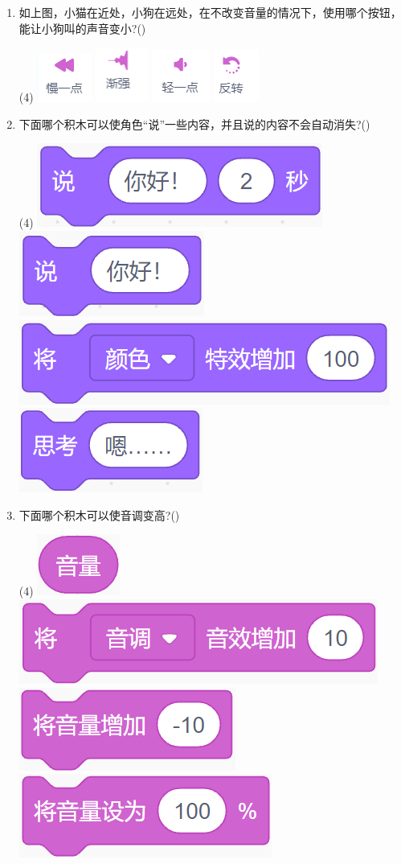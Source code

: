\documentclass[10pt, a4paper]{article}
\begin{document}
\begin{enumerate}
        \item 如上图，小猫在近处，小狗在远处，在不改变音量的情况下，使用哪个按钮，能让小狗叫的声音变小?(\qquad)
        \begin{tasks}(4)
            \task \includegraphics[width=.05\textwidth]{7a.png}
            \task \includegraphics[width=.05\textwidth]{7b.png}
            \task \includegraphics[width=.05\textwidth]{7c.png}
            \task \includegraphics[width=.05\textwidth]{7d.png}
        \end{tasks}
           
        \newpage
        \item 下面哪个积木可以使角色“说”一些内容，并且说的内容不会自动消失?(\qquad)
        \begin{tasks}(4)
            \task \includegraphics[width=.14\textwidth]{8a.png}
            \task \includegraphics[width=.09\textwidth]{8b.png}
            \task \includegraphics[width=.18\textwidth]{8c.png}
            \task \includegraphics[width=.1\textwidth]{8d.png}
        \end{tasks}

        \item 下面哪个积木可以使音调变高?(\qquad)
        \begin{tasks}(4)
            \task \includegraphics[width=.05\textwidth]{9a.png}
            \task \includegraphics[width=.17\textwidth]{9b.png}
            \task \includegraphics[width=.12\textwidth]{9c.png}
            \task \includegraphics[width=.15\textwidth]{9d.png}
        \end{tasks}


\end{enumerate}
\end{document}
